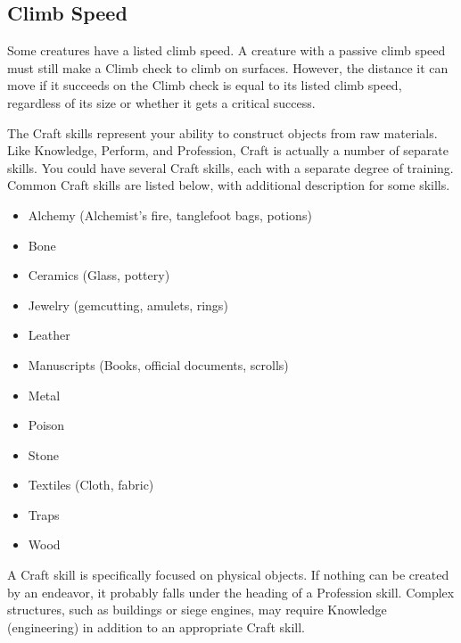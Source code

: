     \subsection{Climb Speed}\label{Climb Speed}
        Some creatures have a listed climb speed.
        A creature with a passive climb speed must still make a Climb check to climb on surfaces.
        However, the distance it can move if it succeeds on the Climb check is equal to its listed climb speed, regardless of its size or whether it gets a critical success.

\newpage
{}
    The Craft skills represent your ability to construct objects from raw materials.
    Like Knowledge, Perform, and Profession, Craft is actually a number of separate skills.
    You could have several Craft skills, each with a separate degree of training.
    Common Craft skills are listed below, with additional description for some skills.

    \begin{itemize}
        \item Alchemy (Alchemist's fire, tanglefoot bags, potions)
        \item Bone
        \item Ceramics (Glass, pottery)
        \item Jewelry (gemcutting, amulets, rings)
        \item Leather
        \item Manuscripts (Books, official documents, scrolls)
        \item Metal
        \item Poison
        \item Stone
        \item Textiles (Cloth, fabric)
        \item Traps
        \item Wood
    \end{itemize}

    A Craft skill is specifically focused on physical objects. If nothing can be created by an endeavor, it probably falls under the heading of a Profession skill. Complex structures, such as buildings or siege engines, may require Knowledge (engineering) in addition to an appropriate Craft skill.

